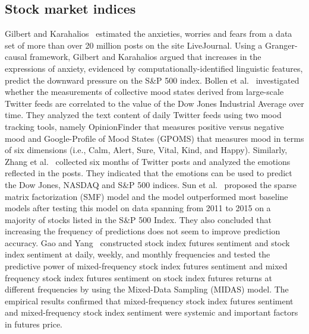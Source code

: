 \documentclass[review,3p,times,12pt,number]{elsarticle}
\begin{document}
\subsection{Stock market indices}
Gilbert and Karahalios~\cite{Gilbert2010} estimated the anxieties, worries and fears from a data set of more than over 20 million posts on the site LiveJournal. Using a Granger-causal framework, Gilbert and Karahalios argued that increases in the expressions of anxiety, evidenced by computationally-identified linguistic features, predict the downward pressure on the S\&P 500 index.
Bollen et al.~\cite{bollen2011twitter} investigated whether the measurements of collective mood states derived from large-scale Twitter feeds are correlated to the value of the Dow Jones Industrial Average over time. They analyzed the text content of daily Twitter feeds using two mood tracking tools, namely OpinionFinder that measures positive versus negative mood and Google-Profile of Mood States (GPOMS) that measures mood in terms of six dimensions (i.e., Calm, Alert, Sure, Vital, Kind, and Happy).
Similarly, Zhang et al.~\cite{zhang2011predicting} collected six months of Twitter posts and analyzed the emotions reflected in the posts. They indicated that the emotions can be used to predict the Dow Jones, NASDAQ and S\&P 500 indices.
Sun et al.~\cite{Sun2016Trade} proposed the sparse matrix factorization (SMF) model and the model outperformed most baseline models after testing this model on data spanning from 2011 to 2015 on a majority of stocks listed in the S\&P 500 Index. They also concluded that increasing the frequency of predictions does not seem to improve prediction accuracy.
Gao and Yang~\cite{Gao2017Forecasting} constructed stock index futures sentiment and stock index sentiment at daily, weekly, and monthly frequencies and tested the predictive power of mixed-frequency stock index futures sentiment and mixed frequency stock index futures sentiment on stock index futures returns at different frequencies by using the Mixed-Data Sampling (MIDAS) model. The empirical results confirmed that mixed-frequency stock index futures sentiment and mixed-frequency stock index sentiment were systemic and important factors in futures price.
\end{document}
